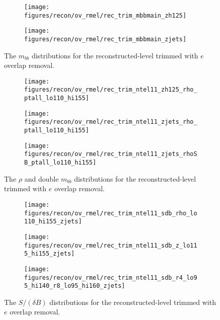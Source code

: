 \begin{figure}[!htbp]\captionsetup{justification=centering}
\begin{center}
\begin{subfigure}[t]{18pc}\centering\texttt{[image: figures/recon/ov\_rmel/rec\_trim\_mbbmain\_zh125]}\caption{}\end{subfigure}
\begin{subfigure}[t]{18pc}\centering\texttt{[image: figures/recon/ov\_rmel/rec\_trim\_mbbmain\_zjets]}\caption{}\end{subfigure}
\caption{\label{fig:mbbwz}The $m_{bb}$ distributions for the reconstructed-level trimmed with $e$ overlap removal.}
\end{center}
\end{figure}
\begin{figure}[!htbp]\captionsetup{justification=centering}
\begin{center}
\begin{subfigure}[t]{18pc}\centering\texttt{[image: figures/recon/ov\_rmel/rec\_trim\_ntel11\_zh125\_rho\_ptall\_lo110\_hi155]}\caption{}\end{subfigure}
\begin{subfigure}[t]{18pc}\centering\texttt{[image: figures/recon/ov\_rmel/rec\_trim\_ntel11\_zjets\_rho\_ptall\_lo110\_hi155]}\caption{}\end{subfigure}
\begin{subfigure}[t]{18pc}\centering\texttt{[image: figures/recon/ov\_rmel/rec\_trim\_ntel11\_zjets\_rhoSB\_ptall\_lo110\_hi155]}\caption{}\end{subfigure}
\caption{\label{fig:mbbwz}The $\rho$ and double $m_{bb}$ distributions for the reconstructed-level trimmed with $e$ overlap removal.}
\end{center}
\end{figure}
\begin{figure}[!htbp]\captionsetup{justification=centering}
\begin{center}
\begin{subfigure}[t]{18pc}\centering\texttt{[image: figures/recon/ov\_rmel/rec\_trim\_ntel11\_sdb\_rho\_lo110\_hi155\_zjets]}\caption{}\end{subfigure}
\begin{subfigure}[t]{18pc}\centering\texttt{[image: figures/recon/ov\_rmel/rec\_trim\_ntel11\_sdb\_z\_lo115\_hi155\_zjets]}\caption{}\end{subfigure}
\begin{subfigure}[t]{18pc}\centering\texttt{[image: figures/recon/ov\_rmel/rec\_trim\_ntel11\_sdb\_r4\_lo95\_hi140\_r8\_lo95\_hi160\_zjets]}\caption{}\end{subfigure}
\caption{\label{fig:mbbwz}The $S/(\delta B)$ distributions for the reconstructed-level trimmed with $e$ overlap removal.}
\end{center}
\end{figure}
\clearpage

